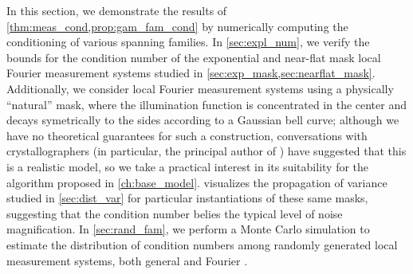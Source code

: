 In this section, we demonstrate the results of \cref{thm:meas_cond,prop:gam_fam_cond} by numerically computing the conditioning of various spanning families.  In \cref{sec:expl_num}, we verify the bounds for the condition number of the exponential and near-flat mask local Fourier measurement systems studied in \cref{sec:exp_mask,sec:nearflat_mask}.  Additionally, we consider local Fourier measurement systems using a physically ``natural'' mask, where the illumination function is concentrated in the center and decays symetrically to the sides according to a Gaussian bell curve; although we have no theoretical guarantees for such a construction, conversations with crystallographers (in particular, the principal author of \cite{andrej2018battery}) have suggested that this is a realistic model, so we take a practical interest in its suitability for the algorithm proposed in \cref{ch:base_model}.   visualizes the propagation of variance studied in \cref{sec:dist_var} for particular instantiations of these same masks, suggesting that the condition number belies the typical level of noise magnification.  In \cref{sec:rand_fam}, we perform a Monte Carlo simulation to estimate the distribution of condition numbers among randomly generated local measurement systems, both general and Fourier%
.


